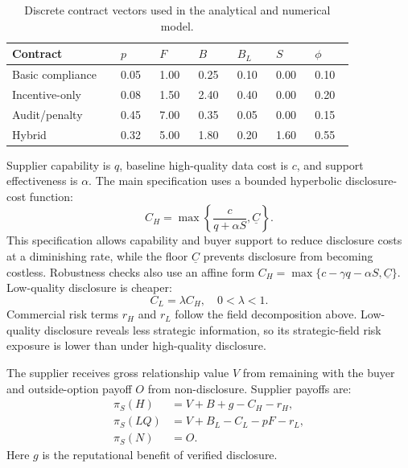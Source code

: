 \documentclass[final,5p,times,authoryear]{elsarticle}
\begin{document}
\begin{table}[t]
\centering
\begingroup
\setlength{\tabcolsep}{3pt}
\small
\caption{Discrete contract vectors used in the analytical and numerical model.}
\label{tab:contract_vectors}
\begin{tabular}{@{}p{0.28\linewidth}p{0.10\linewidth}p{0.10\linewidth}p{0.10\linewidth}p{0.10\linewidth}p{0.10\linewidth}p{0.10\linewidth}@{}}
\toprule
Contract & $p$ & $F$ & $B$ & $B_L$ & $S$ & $\phi$ \\
\midrule
Basic compliance & 0.05 & 1.00 & 0.25 & 0.10 & 0.00 & 0.10 \\
Incentive-only & 0.08 & 1.50 & 2.40 & 0.40 & 0.00 & 0.20 \\
Audit/penalty & 0.45 & 7.00 & 0.35 & 0.05 & 0.00 & 0.15 \\
Hybrid & 0.32 & 5.00 & 1.80 & 0.20 & 1.60 & 0.55 \\
\bottomrule
\end{tabular}
\endgroup
\end{table}

Supplier capability is $q$, baseline high-quality data cost is $c$, and support effectiveness is $\alpha$. The main specification uses a bounded hyperbolic disclosure-cost function:
\begin{equation}
C_H=\max\left\{\frac{c}{q+\alpha S},\underline{C}\right\}.
\end{equation}
This specification allows capability and buyer support to reduce disclosure costs at a diminishing rate, while the floor $\underline{C}$ prevents disclosure from becoming costless. Robustness checks also use an affine form $C_H=\max\{c-\gamma q-\alpha S,\underline{C}\}$.
Low-quality disclosure is cheaper:
\begin{equation}
C_L=\lambda C_H, \quad 0<\lambda<1.
\end{equation}
Commercial risk terms $r_H$ and $r_L$ follow the field decomposition above. Low-quality disclosure reveals less strategic information, so its strategic-field risk exposure is lower than under high-quality disclosure.

The supplier receives gross relationship value $V$ from remaining with the buyer and outside-option payoff $O$ from non-disclosure. Supplier payoffs are:
\begin{align}
\pi_S(H)&=V+B+g-C_H-r_H,\\
\pi_S(LQ)&=V+B_L-C_L-pF-r_L,\\
\pi_S(N)&=O.
\end{align}
Here $g$ is the reputational benefit of verified disclosure.
\end{document}
